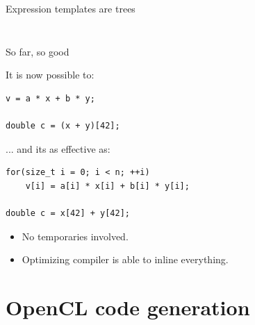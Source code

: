 \documentclass[@BEAMER_OPTIONS@]{beamer}
\begin{document}
\begin{frame}[fragile]{Expression templates are trees}
\begin{columns}
\begin{column}{0.45\textwidth}
\begin{figure}
            \end{figure}
        \end{column}
    \end{columns}
\end{frame}

\note{ }

\begin{frame}[fragile]{So far, so good}
    \begin{exampleblock}{It is now possible to:}
        \begin{lstlisting}
v = a * x + b * y;

double c = (x + y)[42];
        \end{lstlisting}
    \end{exampleblock}

    \begin{exampleblock}{... and its as effective as:}
        \begin{lstlisting}
for(size_t i = 0; i < n; ++i)
    v[i] = a[i] * x[i] + b[i] * y[i];

double c = x[42] + y[42];
        \end{lstlisting}
    \end{exampleblock}
    \begin{itemize}
        \item No temporaries involved.
        \item Optimizing compiler is able to inline everything.
    \end{itemize}
\end{frame}

\section{OpenCL code generation}

\begin{frame}{}
    \tableofcontents[currentsection]
\end{frame}

\note{ }
\end{document}

